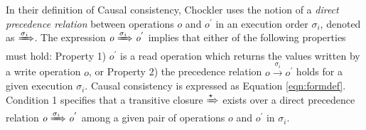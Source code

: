 \documentclass[journal,compsoc]{IEEEtran}
\begin{document}
\par In their definition of Causal consistency, Chockler uses the notion of a 
\emph{direct precedence relation} between operations $\mathit{o}$
 and $\mathit{o}^{'} $ in an execution order $\sigma_i$, denoted as $\xRightarrow{\sigma_i}$. The expression $\mathit{o} \xRightarrow{\sigma_i} \mathit{o}^{'} $
  implies that either of the following properties must hold: Property 1) $\mathit{o}^{'} $ is a read operation which returns the values written by a write operation $\mathit{o}$, or Property 2)  %
 the precedence relation 
$\mathit{o} \xrightarrow{\sigma_i} \mathit{o}^{'} $  holds for a given execution $\sigma_i$. Causal consistency is expressed as Equation \ref{eqn:formdef}. Condition 1 specifies that a transitive closure  $\xRightarrow{\star}$ exists  
  over a direct precedence relation $\mathit{o} \xRightarrow{\sigma_i} \mathit{o}^{'}$ among a given pair of operations $\mathit{o}$  and $\mathit{o}^{'} $ in $\sigma_i$. %
\end{document}
